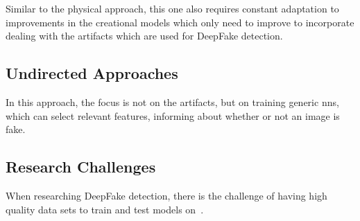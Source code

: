 \par
Similar to the physical approach, this one also requires constant adaptation to
improvements in the creational models which only need to improve to incorporate
dealing with the artifacts which are used for DeepFake detection\cite{mirsky_creation_2020}.


\subsection{Undirected Approaches}
In this approach, the focus is not on the artifacts, but on training generic
\glspl{nn}, which can select relevant features, informing about whether or not
an image is fake. 

\subsection{Research Challenges}
When researching DeepFake detection, there is the challenge of having high
quality data sets to train and test models on~\cite{li_celeb-df_2019}.
